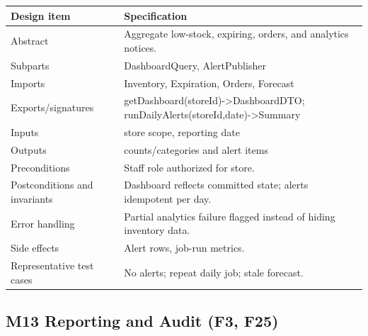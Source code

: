 {\def\LTcaptype{none} %
\begin{longtable}[]{|
  >{\raggedright\arraybackslash}m{}|
  >{\raggedright\arraybackslash}m{}|}
\hline
\begin{minipage}[c]{\linewidth}\raggedright
\textbf{Design item}
\end{minipage} & \begin{minipage}[c]{\linewidth}\raggedright
\textbf{Specification}
\end{minipage} \\
\hline
\endhead

\endlastfoot
Abstract & Aggregate low-stock, expiring, orders, and analytics notices. \\ \hline
Subparts & DashboardQuery, AlertPublisher \\ \hline
Imports & Inventory, Expiration, Orders, Forecast \\ \hline
Exports/signatures & getDashboard(storeId)-\textgreater DashboardDTO; runDailyAlerts(storeId,date)-\textgreater Summary \\ \hline
Inputs & store scope, reporting date \\ \hline
Outputs & counts/categories and alert items \\ \hline
Preconditions & Staff role authorized for store. \\ \hline
Postconditions and invariants & Dashboard reflects committed state; alerts idempotent per day. \\ \hline
Error handling & Partial analytics failure flagged instead of hiding inventory data. \\ \hline
Side effects & Alert rows, job-run metrics. \\ \hline
Representative test cases & No alerts; repeat daily job; stale forecast. \\ \hline
\end{longtable}
}

\subsection{M13 Reporting and Audit (F3, F25)}\label{m13-reporting-and-audit-f3-f25}

